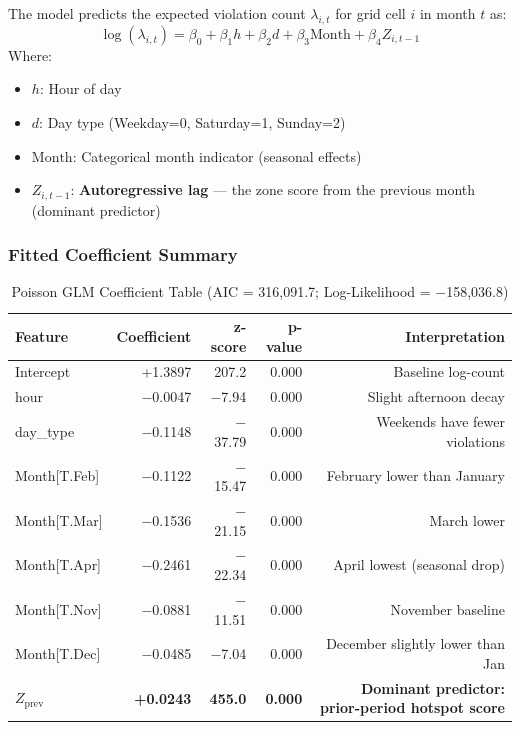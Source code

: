 \documentclass[12pt,a4paper]{article}
\begin{document}
\begin{tcolorbox}[formulabox]
The model predicts the expected violation count $\lambda_{i,t}$ for grid cell $i$ in month $t$ as:
\begin{equation}
    \log(\lambda_{i,t}) = \beta_0 + \beta_1 h + \beta_2 d + \beta_3 \text{Month} + \beta_4 Z_{i,t-1}
    \label{eq:poisson_glm}
\end{equation}
Where:
\begin{itemize}[leftmargin=2em, itemsep=2pt]
    \item $h$: Hour of day
    \item $d$: Day type (Weekday=0, Saturday=1, Sunday=2)
    \item $\text{Month}$: Categorical month indicator (seasonal effects)
    \item $Z_{i,t-1}$: \textbf{Autoregressive lag} — the zone score from the previous month (dominant predictor)
\end{itemize}
\end{tcolorbox}

\subsubsection{Fitted Coefficient Summary}

\begin{table}[H]
\centering
\caption{Poisson GLM Coefficient Table (AIC = 316,091.7; Log-Likelihood = $-$158,036.8)}
\begin{tabular}{lrrrr}
\toprule
\textbf{Feature} & \textbf{Coefficient} & \textbf{z-score} & \textbf{p-value} & \textbf{Interpretation} \\
\midrule
Intercept & +1.3897 & 207.2 & 0.000 & Baseline log-count \\
hour & $-$0.0047 & $-$7.94 & 0.000 & Slight afternoon decay \\
day\_type & $-$0.1148 & $-$37.79 & 0.000 & Weekends have fewer violations \\
Month[T.Feb] & $-$0.1122 & $-$15.47 & 0.000 & February lower than January \\
Month[T.Mar] & $-$0.1536 & $-$21.15 & 0.000 & March lower \\
Month[T.Apr] & $-$0.2461 & $-$22.34 & 0.000 & April lowest (seasonal drop) \\
Month[T.Nov] & $-$0.0881 & $-$11.51 & 0.000 & November baseline \\
Month[T.Dec] & $-$0.0485 & $-$7.04 & 0.000 & December slightly lower than Jan \\
\rowcolor{emerald!10} \textbf{$Z_\text{prev}$} & \textbf{+0.0243} & \textbf{455.0} & \textbf{0.000} & \textbf{Dominant predictor: prior-period hotspot score} \\
\bottomrule
\end{tabular}
\end{table}
\end{document}

